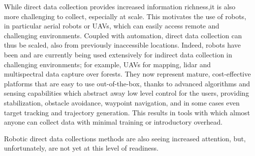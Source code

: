 





While direct data collection provides increased information richness,it is also more challenging to collect, especially at scale. 
This motivates the use of robots, in particular aerial robots or UAVs, which can easily access remote and challenging environments. Coupled with automation, direct data collection can thus be scaled, also from previously inaccessible locations.
Indeed, robots have been and are currently being used extensively for indirect data collection in challenging environments; for example, UAVs for mapping, lidar and multispectral data capture over forests. They now represent mature, cost-effective platforms that are easy to use out-of-the-box, thanks to advanced algorithms and sensing capabilities which abstract away low level control for the users, providing stabilization, obstacle avoidance, waypoint navigation, and in some cases even target tracking and trajectory generation. This results in tools with which almost anyone can collect data with minimal training or introductory overhead. 

Robotic direct data collections methods are also seeing increased attention, but, unfortunately, are not yet at this level of readiness.







